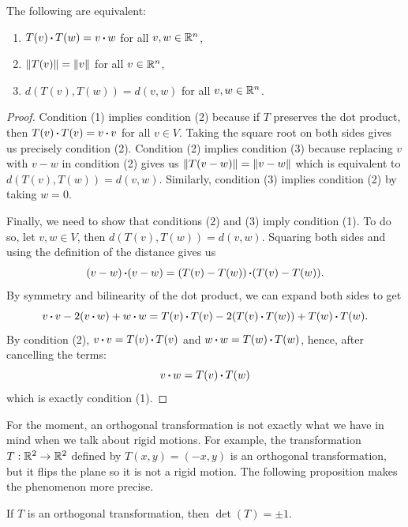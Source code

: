 \begin{proposition}
    The following are equivalent:
    \begin{enumerate}[label=(\arabic*)]
        \item $T(v) \operatorname{\boldsymbol{\cdot}} T(w) = v \operatorname{\boldsymbol{\cdot}} w$ for all $v,w \in \mathbb{R}^n$,
        \item $\left\lVert T(v) \right\rVert = \left\lVert v \right\rVert$ for all $v \in \mathbb{R}^n$,
        \item $d(T(v), T(w)) = d(v,w)$ for all $v ,w \in \mathbb{R}^n$.
    \end{enumerate}
\end{proposition}

\begin{proof}
    Condition (1) implies condition (2) because if $T$ preserves the dot product, then $T(v)\operatorname{\boldsymbol{\cdot}} T(v) = v\operatorname{\boldsymbol{\cdot}} v$ for all $v \in V$. Taking the square root on both sides gives us precisely condition (2). Condition (2) implies condition (3) because replacing $v$ with $v - w$ in condition (2) gives us $\left\lVert T(v - w) \right\rVert = \left\lVert v - w \right\rVert$ which is equivalent to $d(T(v),T(w)) = d(v,w)$. Similarly, condition (3) implies condition (2) by taking $w = 0$.
    
    Finally, we need to show that conditions (2) and (3) imply condition (1). To do so, let $v,w \in V$, then $d(T(v), T(w)) = d(v,w)$. Squaring both sides and using the definition of the distance gives us
    $$(v-w)\operatorname{\boldsymbol{\cdot}} (v-w) = (T(v) - T(w)) \operatorname{\boldsymbol{\cdot}} (T(v) - T(w)).$$
    By symmetry and bilinearity of the dot product, we can expand both sides to get
    $$v\operatorname{\boldsymbol{\cdot}} v - 2(v\operatorname{\boldsymbol{\cdot}} w) + w\operatorname{\boldsymbol{\cdot}} w = T(v)\operatorname{\boldsymbol{\cdot}} T(v) - 2(T(v)\operatorname{\boldsymbol{\cdot}} T(w)) + T(w)\operatorname{\boldsymbol{\cdot}} T(w).$$
    By condition (2), $v\operatorname{\boldsymbol{\cdot}} v = T(v)\operatorname{\boldsymbol{\cdot}} T(v)$ and $w\operatorname{\boldsymbol{\cdot}} w = T(w)\operatorname{\boldsymbol{\cdot}} T(w)$, hence, after cancelling the terms:
    $$v\operatorname{\boldsymbol{\cdot}} w = T(v)\operatorname{\boldsymbol{\cdot}} T(w)$$
    which is exactly condition (1).
\end{proof}

For the moment, an orthogonal transformation is not exactly what we have in mind when we talk about rigid motions. For example, the transformation $T: \mathbb{R}^2 \to \mathbb{R}^2$ defined by  $T(x,y) = (-x, y)$ is an orthogonal transformation, but it flips the plane so it is not a rigid motion. The following proposition makes the phenomenon more precise.

\begin{proposition}
    If $T$ is an orthogonal transformation, then $\det(T) = \pm 1$.
\end{proposition}

